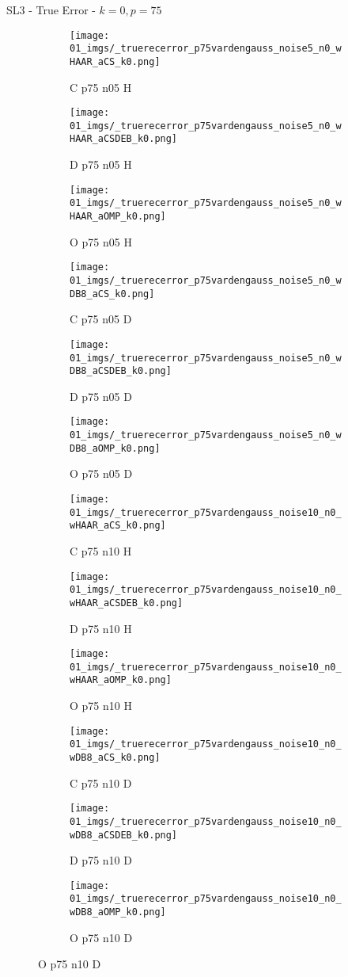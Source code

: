 \begin{frame}{SL3 - True Error - $k=0,p=75$}{}
\begin{figure}
\begin{subfigure}{0.13\textwidth}
\texttt{[image: 01\_imgs/\_truerecerror\_p75vardengauss\_noise5\_n0\_wHAAR\_aCS\_k0.png]}
\caption*{\tiny C p75 n05 H}
\end{subfigure}
\begin{subfigure}{0.13\textwidth}
\texttt{[image: 01\_imgs/\_truerecerror\_p75vardengauss\_noise5\_n0\_wHAAR\_aCSDEB\_k0.png]}
\caption*{\tiny D p75 n05 H}
\end{subfigure}
\begin{subfigure}{0.13\textwidth}
\texttt{[image: 01\_imgs/\_truerecerror\_p75vardengauss\_noise5\_n0\_wHAAR\_aOMP\_k0.png]}
\caption*{\tiny O p75 n05 H}
\end{subfigure}
\begin{subfigure}{0.13\textwidth}
\texttt{[image: 01\_imgs/\_truerecerror\_p75vardengauss\_noise5\_n0\_wDB8\_aCS\_k0.png]}
\caption*{\tiny C p75 n05 D}
\end{subfigure}
\begin{subfigure}{0.13\textwidth}
\texttt{[image: 01\_imgs/\_truerecerror\_p75vardengauss\_noise5\_n0\_wDB8\_aCSDEB\_k0.png]}
\caption*{\tiny D p75 n05 D}
\end{subfigure}
\begin{subfigure}{0.13\textwidth}
\texttt{[image: 01\_imgs/\_truerecerror\_p75vardengauss\_noise5\_n0\_wDB8\_aOMP\_k0.png]}
\caption*{\tiny O p75 n05 D}
\end{subfigure}

\vspace{5pt}

\begin{subfigure}{0.13\textwidth}
\texttt{[image: 01\_imgs/\_truerecerror\_p75vardengauss\_noise10\_n0\_wHAAR\_aCS\_k0.png]}
\caption*{\tiny C p75 n10 H}
\end{subfigure}
\begin{subfigure}{0.13\textwidth}
\texttt{[image: 01\_imgs/\_truerecerror\_p75vardengauss\_noise10\_n0\_wHAAR\_aCSDEB\_k0.png]}
\caption*{\tiny D p75 n10 H}
\end{subfigure}
\begin{subfigure}{0.13\textwidth}
\texttt{[image: 01\_imgs/\_truerecerror\_p75vardengauss\_noise10\_n0\_wHAAR\_aOMP\_k0.png]}
\caption*{\tiny O p75 n10 H}
\end{subfigure}
\begin{subfigure}{0.13\textwidth}
\texttt{[image: 01\_imgs/\_truerecerror\_p75vardengauss\_noise10\_n0\_wDB8\_aCS\_k0.png]}
\caption*{\tiny C p75 n10 D}
\end{subfigure}
\begin{subfigure}{0.13\textwidth}
\texttt{[image: 01\_imgs/\_truerecerror\_p75vardengauss\_noise10\_n0\_wDB8\_aCSDEB\_k0.png]}
\caption*{\tiny D p75 n10 D}
\end{subfigure}
\begin{subfigure}{0.13\textwidth}
\texttt{[image: 01\_imgs/\_truerecerror\_p75vardengauss\_noise10\_n0\_wDB8\_aOMP\_k0.png]}
\caption*{\tiny O p75 n10 D}
\end{subfigure}


\end{figure}
\end{frame}
